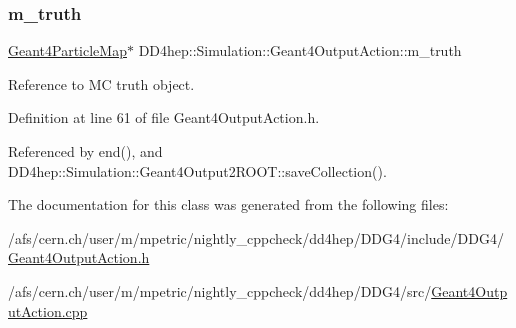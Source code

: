 \subsubsection{\texorpdfstring{m\+\_\+truth}{m\_truth}}
{\footnotesize\ttfamily \hyperlink{class_d_d4hep_1_1_simulation_1_1_geant4_particle_map}{Geant4\+Particle\+Map}$\ast$ D\+D4hep\+::\+Simulation\+::\+Geant4\+Output\+Action\+::m\+\_\+truth\hspace{0.3cm}{\ttfamily [protected]}}



Reference to MC truth object. 



Definition at line 61 of file Geant4\+Output\+Action.\+h.



Referenced by end(), and D\+D4hep\+::\+Simulation\+::\+Geant4\+Output2\+R\+O\+O\+T\+::save\+Collection().



The documentation for this class was generated from the following files\+:\begin{DoxyCompactItemize}
\item 
/afs/cern.\+ch/user/m/mpetric/nightly\+\_\+cppcheck/dd4hep/\+D\+D\+G4/include/\+D\+D\+G4/\hyperlink{_geant4_output_action_8h}{Geant4\+Output\+Action.\+h}\item 
/afs/cern.\+ch/user/m/mpetric/nightly\+\_\+cppcheck/dd4hep/\+D\+D\+G4/src/\hyperlink{_geant4_output_action_8cpp}{Geant4\+Output\+Action.\+cpp}\end{DoxyCompactItemize}

